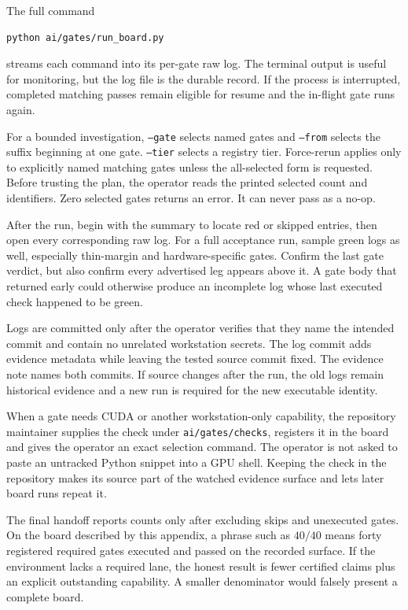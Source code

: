 \documentclass[10pt,aps,prd,twocolumn,nofootinbib]{revtex4-2}
\newcommand{\code}[1]{\texttt{#1}}
\begin{document}
The full command
\begin{verbatim}
python ai/gates/run_board.py
\end{verbatim}
streams each command into its per-gate raw log.  The terminal output is useful
for monitoring, but the log file is the durable record.  If the process is
interrupted, completed matching passes remain eligible for resume and the
in-flight gate runs again.

For a bounded investigation, \code{--gate} selects named gates and
\code{--from} selects the suffix beginning at one gate.  \code{--tier}
selects a registry tier.  Force-rerun applies only to explicitly named
matching gates unless the all-selected form is requested.  Before trusting
the plan, the operator reads the printed selected count and identifiers.  Zero
selected gates returns an error.  It can never pass as a no-op.

After the run, begin with the summary to locate red or skipped entries, then
open every corresponding raw log.  For a full acceptance run, sample green
logs as well, especially thin-margin and hardware-specific gates.  Confirm
the last gate verdict, but also confirm every advertised leg appears above it.
A gate body that returned early could otherwise produce an incomplete log
whose last executed check happened to be green.

Logs are committed only after the operator verifies that they name the
intended commit and contain no unrelated workstation secrets.  The log commit
adds evidence metadata while leaving the tested source commit fixed.  The
evidence note names both commits.  If source changes after the run, the old logs
remain historical evidence and a new run is required for the new executable
identity.

When a gate needs CUDA or another workstation-only capability, the repository
maintainer supplies the check under \code{ai/gates/checks}, registers it in the
board and gives the operator an exact selection command.  The operator is not
asked to paste an untracked Python snippet into a GPU shell.  Keeping the
check in the repository makes its source part of the watched evidence surface
and lets later board runs repeat it.

The final handoff reports counts only after excluding skips and unexecuted
gates.  On the board described by this appendix, a phrase such as \(40/40\)
means forty registered required gates executed and passed on the recorded
surface.  If the environment lacks
a required lane, the honest result is fewer certified claims plus an explicit
outstanding capability.  A smaller denominator would falsely present a
complete board.
\end{document}
